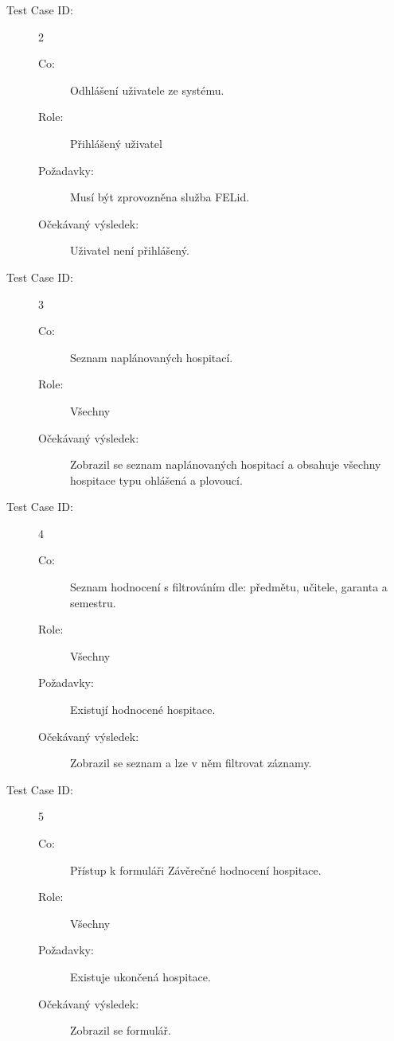 \begin{description}
\item[Test Case ID:] 2
\begin{description}
\item[Co:] Odhlášení uživatele ze systému.
\item[Role:] Přihlášený uživatel
\item[Požadavky:] Musí být zprovozněna služba FELid.
\item[Očekávaný výsledek:] Uživatel není přihlášený.
\end{description}
\end{description}

\begin{description}
\item[Test Case ID:] 3
\begin{description}
\item[Co:] Seznam naplánovaných hospitací.
\item[Role:] Všechny
\item[Očekávaný výsledek:] Zobrazil se seznam naplánovaných hospitací a obsahuje všechny hospitace typu ohlášená a plovoucí.
\end{description}
\end{description}

\begin{description}
\item[Test Case ID:] 4
\begin{description}
\item[Co:] Seznam hodnocení s filtrováním dle: předmětu, učitele, garanta a semestru.
\item[Role:] Všechny
\item[Požadavky:] Existují hodnocené hospitace.
\item[Očekávaný výsledek:] Zobrazil se seznam a lze v něm filtrovat záznamy. 
\end{description}
\end{description}

\begin{description}
\item[Test Case ID:] 5
\begin{description}
\item[Co:] Přístup k formuláři Závěrečné hodnocení hospitace.
\item[Role:] Všechny
\item[Požadavky:] Existuje ukončená hospitace.
\item[Očekávaný výsledek:] Zobrazil se formulář. 
\end{description}
\end{description}

